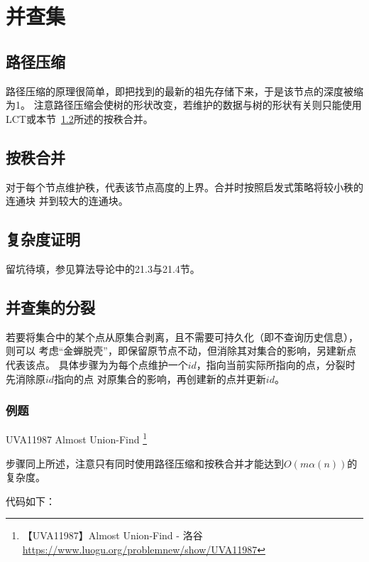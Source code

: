 \section{并查集}\label{DSU}
\subsection{路径压缩}
路径压缩的原理很简单，即把找到的最新的祖先存储下来，于是该节点的深度被缩为1。
注意路径压缩会使树的形状改变，若维护的数据与树的形状有关则只能使用
LCT或本节~\ref{RankMerge}所述的按秩合并。
\subsection{按秩合并}\label{RankMerge}
对于每个节点维护秩，代表该节点高度的上界。合并时按照启发式策略将较小秩的连通块
并到较大的连通块。
\subsection{复杂度证明}
留坑待填，参见算法导论\cite{ITA3}中的21.3与21.4节。
\subsection{并查集的分裂}
若要将集合中的某个点从原集合剥离，且不需要可持久化（即不查询历史信息），则可以
考虑``金蝉脱壳''，即保留原节点不动，但消除其对集合的影响，另建新点代表该点。
具体步骤为为每个点维护一个$id$，指向当前实际所指向的点，分裂时先消除原$id$指向的点
对原集合的影响，再创建新的点并更新$id$。

\subsubsection{例题}

UVA11987 Almost Union-Find \footnote{
    【UVA11987】Almost Union-Find - 洛谷
    \url{https://www.luogu.org/problemnew/show/UVA11987}}

步骤同上所述，注意只有同时使用路径压缩和按秩合并才能达到$O(m\alpha(n))$的复杂度。

代码如下：

